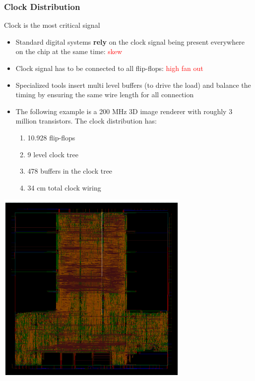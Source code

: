 \documentclass[compress]{beamer}
\begin{document}
\begin{frame}
	\frametitle{Clock Distribution}
		\begin{block}{Clock is the most critical signal}
		\begin{itemize}
			\item Standard digital systems \textbf{rely} on the clock signal being present everywhere on the chip at the same time: \textcolor{red}{skew}
			\item Clock signal has to be connected to all flip-flops: \textcolor{red}{high fan out}
			\item Specialized tools insert multi level buffers (to drive the load) and balance the timing by ensuring the same wire length for all connection
			\pause
			\item The following example is a 200 MHz 3D image renderer with roughly 3 million transistors. The clock distribution has:
			\begin{enumerate}
				\item 10.928 flip-flops
				\item 9 level clock tree
				\item 478 buffers in the clock tree
				\item 34 cm total clock wiring
			\end{enumerate}
		\end{itemize}
	\end{block}
\end{frame}
\begin{frame}
	\begin{center}
		\includegraphics[width=0.7\textwidth]{clk}
	\end{center}
\end{frame}
\end{document}
